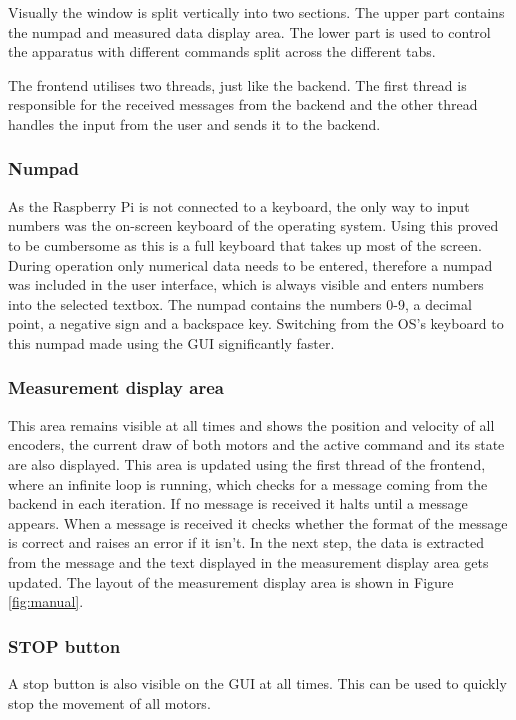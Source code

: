 \documentclass[12pt]{article}
\begin{document}
Visually the window is split vertically into two sections. The upper part contains the numpad and measured data display area. The lower part is used to control the apparatus with different commands split across the different tabs.

The frontend utilises two threads, just like the backend. The first thread is responsible for the received messages from the backend and the other thread handles the input from the user and sends it to the backend.


\subsubsection{Numpad}
As the Raspberry Pi is not connected to a keyboard, the only way to input numbers was the on-screen keyboard of the operating system. Using this proved to be cumbersome as this is a full keyboard that takes up most of the screen. During operation only numerical data needs to be entered, therefore a numpad was included in the user interface, which is always visible and enters numbers into the selected textbox. The numpad contains the numbers 0-9, a decimal point, a negative sign and a backspace key. Switching from the OS's keyboard to this numpad made using the GUI significantly faster.


\subsubsection{Measurement display area}
This area remains visible at all times and shows the position and velocity of all encoders, the current draw of both motors and the active command and its state are also displayed. This area is updated using the first thread of the frontend, where an infinite loop is running, which checks for a message coming from the backend in each iteration. If no message is received it halts until a message appears. When a message is received it checks whether the format of the message is correct and raises an error if it isn't. In the next step, the data is extracted from the message and the text displayed in the measurement display area gets updated. The layout of the measurement display area is shown in Figure \ref{fig:manual}.

\subsubsection{STOP button}
A stop button is also visible on the GUI at all times. This can be used to quickly stop the movement of all motors.
\end{document}
